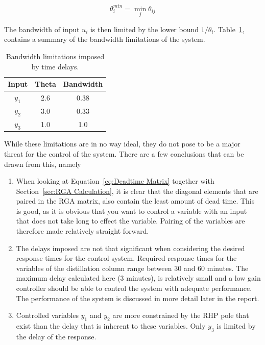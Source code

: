 \begin{equation}
	\theta_i^{min} = \min_j \theta_{ij}
\end{equation}

The bandwidth of input $u_i$ is then limited by the lower bound $1/\theta_i$. Table~\ref{tab:Bandwidths}, contains a summary of the bandwidth limitations of the system.

\begin{table}[H]
	\centering
	\begin{tabular}{ccc}
		\hline
		\textbf{Input} & \textbf{Theta} & \textbf{Bandwidth} \\
		\hline
		$y_1$             & 2.6            & 0.38               \\
		$y_2$             & 3.0              & 0.33               \\
		$y_3$             & 1.0              & 1.0                 \\\hline
	\end{tabular}
	\caption{Bandwidth limitations imposed by time delays.}
	\label{tab:Bandwidths}
\end{table}

While these limitations are in no way ideal, they do not pose to be a major threat for the control of the system. There are a few conclusions that can be drawn from this, namely

\begin{enumerate}
	\item When looking at Equation~\ref{eq:Deadtime Matrix} together with Section~\ref{sec:RGA Calculation}, it is clear that the diagonal elements that are paired in the RGA matrix, also contain the least amount of dead time. This is good, as it is obvious that you want to control a variable with an input that does not take long to effect the variable. Pairing of the variables are therefore made relatively straight forward.
	\item The delays imposed are not that significant when considering the desired response times for the control system. Required response times for the variables of the distillation column range between 30 and 60 minutes. The maximum delay calculated here (3 minutes), is relatively small and a low gain controller should be able to control the system with adequate performance. The performance of the system is discussed in more detail later in the report.
	\item Controlled variables $y_1$ and $y_2$ are more constrained by the RHP pole that exist than the delay that is inherent to these variables. Only $y_3$ is limited by the delay of the response.
\end{enumerate}

